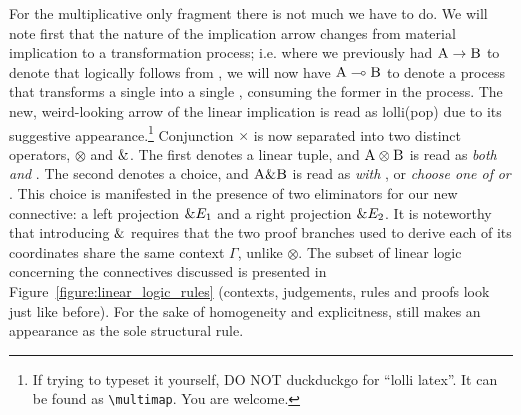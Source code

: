 For the multiplicative only fragment there is not much we have to do.
We will note first that the nature of the implication arrow changes from material implication to a transformation process; i.e. where we previously had $\prop{A} \to \prop{B}$ to denote that  logically follows from , we will now have $\prop{A} \li \prop{B}$ to denote a process that transforms a single  into a single , consuming the former in the process.
The new, weird-looking arrow of the linear implication is read as lolli(pop) due to its suggestive appearance.\footnote{If trying to typeset it yourself, DO NOT duckduckgo for ``lolli latex''. It can be found as \texttt{\textbackslash multimap}. You are welcome.}
Conjunction $\times$ is now separated into two distinct operators, $\otimes$ and $\&$. 
The first denotes a linear tuple, and $\prop{A} \otimes \prop{B}$ is read as \textit{both}  \textit{and} .
The second denotes a choice, and $\prop{A} \with \prop{B}$ is read as  \textit{with} , or \textit{choose one of}  \textit{or} .
This choice is manifested in the presence of two eliminators for our new connective: a left projection $\& E_1$ and a right projection $\& E_2$.
It is noteworthy that introducing $\&$ requires that the two proof branches used to derive each of its coordinates share the same context $\Gamma$, unlike $\otimes$.
The subset of linear logic concerning the connectives discussed is presented in Figure~\ref{figure:linear_logic_rules} (contexts, judgements, rules and proofs look just like before).
For the sake of homogeneity and explicitness, \Exchange{} still makes an appearance as the sole structural rule.


